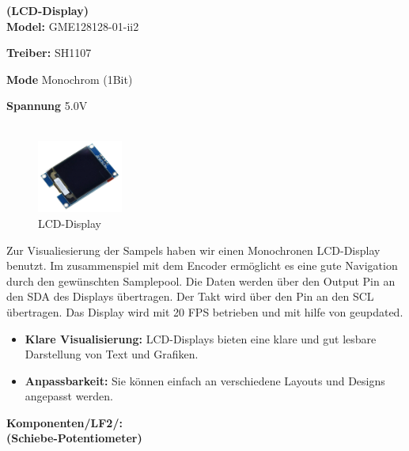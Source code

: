 \vspace{3em}

\textbf{(LCD-Display)} \\

\textbf{Model:} GME128128-01-ii2

\textbf{Treiber:} SH1107

\textbf{Mode} Monochrom (1Bit)

\textbf{Spannung} 5.0V \\ \\

	\begin{figure} %
	\vspace{-160pt + 0.02\textwidth}
	\hspace{0.07\textwidth} %
	\includegraphics[width=0.25\textwidth]{images/05_technische_spezifikation/Interface/Display.png} %
	\caption{LCD-Display}
	\label{fig:lcd_display}
	\vspace{-20pt}
\end{figure}


Zur Visualiesierung der Sampels haben wir einen Monochronen LCD-Display benutzt. Im zusammenspiel mit dem Encoder ermöglicht es eine gute Navigation durch den gewünschten Samplepool. Die Daten werden über den Output Pin   an den SDA des Displays übertragen. Der Takt wird über den Pin   an den SCL übertragen. Das Display wird mit 20 FPS betrieben und mit hilfe von  geupdated.

\begin{itemize}
	\item \textbf{Klare Visualisierung:} LCD-Displays bieten eine klare und gut lesbare Darstellung von Text und Grafiken.
	\item \textbf{Anpassbarkeit:} Sie können einfach an verschiedene Layouts und Designs angepasst werden.
\end{itemize}

\newpage
\textbf{Komponenten/LF2/:}\\

\textbf{(Schiebe-Potentiometer)}\\

